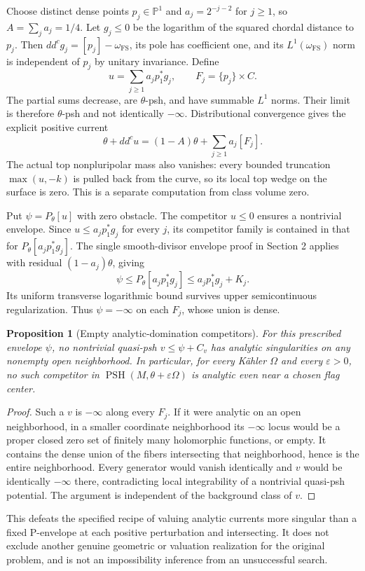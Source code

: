 \documentclass[11pt]{article}
\newtheorem{proposition}{Proposition}
\newcommand{\ddc}{dd^c}
\newcommand{\PSH}{\operatorname{PSH}}
\begin{document}
Choose distinct dense points $p_j\in\mathbb P^1$ and $a_j=2^{-j-2}$ for $j\geq1$, so $A=\sum_j a_j=1/4$. Let $g_j\leq0$ be the logarithm of the squared chordal distance to $p_j$. Then $\ddc g_j=[p_j]-\omega_{\mathrm{FS}}$, its pole has coefficient one, and its $L^1(\omega_{\mathrm{FS}})$ norm is independent of $p_j$ by unitary invariance. Define
\[
 u=\sum_{j\geq1}a_jp_1^*g_j,\qquad F_j=\{p_j\}\times C.
\]
The partial sums decrease, are $\theta$-psh, and have summable $L^1$ norms. Their limit is therefore $\theta$-psh and not identically $-\infty$. Distributional convergence gives the explicit positive current
\[
 \theta+\ddc u=(1-A)\theta+\sum_{j\geq1}a_j[F_j].
\]
The actual top nonpluripolar mass also vanishes: every bounded truncation $\max(u,-k)$ is pulled back from the curve, so its local top wedge on the surface is zero. This is a separate computation from class volume zero.

Put $\psi=P_\theta[u]$ with zero obstacle. The competitor $u\leq0$ ensures a nontrivial envelope. Since $u\leq a_jp_1^*g_j$ for every $j$, its competitor family is contained in that for $P_\theta[a_jp_1^*g_j]$. The single smooth-divisor envelope proof in Section 2 applies with residual $(1-a_j)\theta$, giving
\[
 \psi\leq P_\theta[a_jp_1^*g_j]\leq a_jp_1^*g_j+K_j.
\]
Its uniform transverse logarithmic bound survives upper semicontinuous regularization. Thus $\psi=-\infty$ on each $F_j$, whose union is dense.

\begin{proposition}[Empty analytic-domination competitors]
For this prescribed envelope $\psi$, no nontrivial quasi-psh $v\leq\psi+C_v$ has analytic singularities on any nonempty open neighborhood. In particular, for every K\"ahler $\Omega$ and every $\varepsilon>0$, no such competitor in $\PSH(M,\theta+\varepsilon\Omega)$ is analytic even near a chosen flag center.
\end{proposition}
\begin{proof}
Such a $v$ is $-\infty$ along every $F_j$. If it were analytic on an open neighborhood, in a smaller coordinate neighborhood its $-\infty$ locus would be a proper closed zero set of finitely many holomorphic functions, or empty. It contains the dense union of the fibers intersecting that neighborhood, hence is the entire neighborhood. Every generator would vanish identically and $v$ would be identically $-\infty$ there, contradicting local integrability of a nontrivial quasi-psh potential. The argument is independent of the background class of $v$.
\end{proof}
This defeats the specified recipe of valuing analytic currents more singular than a fixed P-envelope at each positive perturbation and intersecting. It does not exclude another genuine geometric or valuation realization for the original problem, and is not an impossibility inference from an unsuccessful search.
\end{document}
